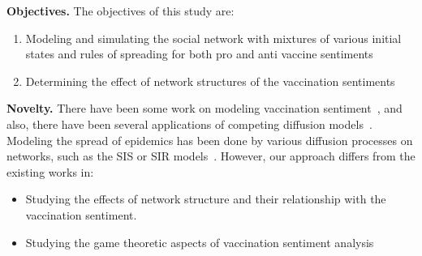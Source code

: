 \noindent
\textbf{Objectives.} The objectives of this study are:
\begin{enumerate}
    \item Modeling and simulating the social network with mixtures of various initial states and rules of spreading for both pro and anti vaccine sentiments
    
    \item Determining the effect of network structures of the vaccination sentiments
\end{enumerate}


\noindent
\textbf{Novelty.} There have been some work on modeling vaccination sentiment~\cite{SHIM2012194}, and also, there have been several applications of competing diffusion models~\cite{prakash2012winner,bharathi2007competitive}. Modeling the spread of epidemics has been done by various diffusion processes on networks, such as the SIS or SIR models~\cite{newman2003structure, grassly2008mathematical}. However, our approach differs from the existing works in:

\begin{itemize}
    
    \item Studying the effects of network structure and their relationship with the vaccination sentiment. 
    
    \item Studying the game theoretic aspects of vaccination sentiment analysis
\end{itemize}

